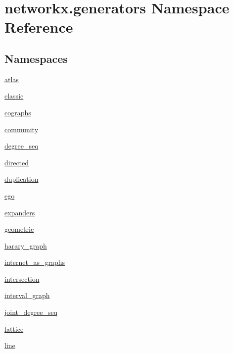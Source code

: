 \hypertarget{namespacenetworkx_1_1generators}{}\section{networkx.\+generators Namespace Reference}
\label{namespacenetworkx_1_1generators}
\subsection*{Namespaces}
\begin{DoxyCompactItemize}
\item 
 \hyperlink{namespacenetworkx_1_1generators_1_1atlas}{atlas}
\item 
 \hyperlink{namespacenetworkx_1_1generators_1_1classic}{classic}
\item 
 \hyperlink{namespacenetworkx_1_1generators_1_1cographs}{cographs}
\item 
 \hyperlink{namespacenetworkx_1_1generators_1_1community}{community}
\item 
 \hyperlink{namespacenetworkx_1_1generators_1_1degree__seq}{degree\+\_\+seq}
\item 
 \hyperlink{namespacenetworkx_1_1generators_1_1directed}{directed}
\item 
 \hyperlink{namespacenetworkx_1_1generators_1_1duplication}{duplication}
\item 
 \hyperlink{namespacenetworkx_1_1generators_1_1ego}{ego}
\item 
 \hyperlink{namespacenetworkx_1_1generators_1_1expanders}{expanders}
\item 
 \hyperlink{namespacenetworkx_1_1generators_1_1geometric}{geometric}
\item 
 \hyperlink{namespacenetworkx_1_1generators_1_1harary__graph}{harary\+\_\+graph}
\item 
 \hyperlink{namespacenetworkx_1_1generators_1_1internet__as__graphs}{internet\+\_\+as\+\_\+graphs}
\item 
 \hyperlink{namespacenetworkx_1_1generators_1_1intersection}{intersection}
\item 
 \hyperlink{namespacenetworkx_1_1generators_1_1interval__graph}{interval\+\_\+graph}
\item 
 \hyperlink{namespacenetworkx_1_1generators_1_1joint__degree__seq}{joint\+\_\+degree\+\_\+seq}
\item 
 \hyperlink{namespacenetworkx_1_1generators_1_1lattice}{lattice}
\item 
 \hyperlink{namespacenetworkx_1_1generators_1_1line}{line}

\end{DoxyCompactItemize}

